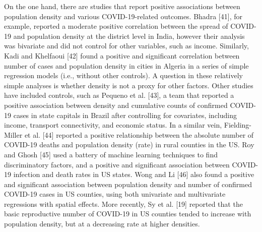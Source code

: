 \documentclass[10pt,letterpaper]{article}
\begin{document}
On the one hand, there are studies that report positive associations
between population density and various COVID-19-related outcomes. Bhadra
{[}41{]}, for example, reported a moderate positive correlation between
the spread of COVID-19 and population density at the district level in
India, however their analysis was bivariate and did not control for
other variables, such as income. Similarly, Kadi and Khelfaoui {[}42{]}
found a positive and significant correlation between number of cases and
population density in cities in Algeria in a series of simple regression
models (i.e., without other controls). A question in these relatively
simple analyses is whether density is not a proxy for other factors.
Other studies have included controls, such as Pequeno et al. {[}43{]}, a
team that reported a positive association between density and cumulative
counts of confirmed COVID-19 cases in state capitals in Brazil after
controlling for covariates, including income, transport connectivity,
and economic status. In a similar vein, Fielding-Miller et al. {[}44{]}
reported a positive relationship between the absolute number of COVID-19
deaths and population density (rate) in rural counties in the US. Roy
and Ghosh {[}45{]} used a battery of machine learning techniques to find
discriminatory factors, and a positive and significant association
between COVID-19 infection and death rates in US states. Wong and Li
{[}46{]} also found a positive and significant association between
population density and number of confirmed COVID-19 cases in US
counties, using both univariate and multivariate regressions with
spatial effects. More recently, Sy et al. {[}19{]} reported that the
basic reproductive number of COVID-19 in US counties tended to increase
with population density, but at a decreasing rate at higher densities.
\end{document}
